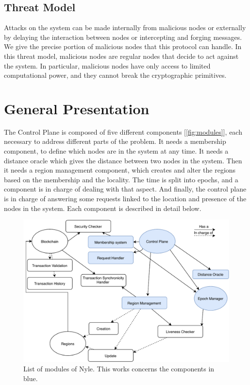 \documentclass[a4paper,11pt,twoside,openright]{report}
\begin{document}
\subsection{Threat Model}
Attacks on the system can be made internally from malicious nodes or
externally by delaying the interaction between nodes or intercepting and
forging messages. We give the precise portion of malicious nodes that
this protocol can handle. In this threat model, malicious nodes are regular
nodes that decide to act against the system. In particular, malicious nodes
have only access to limited computational power, and they cannot break the
cryptographic primitives. 


\section{General Presentation}

The Control Plane is composed of five different components [\autoref{fig:modules}], each necessary to address different parts of the problem.
It needs a membership component, to define which nodes are in the
system at any time. It needs a distance oracle which gives the distance between
two nodes in the system. Then it needs a region management component, which
creates and alter the regions based on the membership and the locality.
The time is split into epochs, and a component is in charge of dealing with that
aspect. And finally, the control plane is in charge of answering some requests
linked to the location and presence of the nodes in the system. Each component
is described in detail below. 

\begin{figure}[!h]
\centering
\includegraphics[width=400pt]{figures/Nyle_components}
\caption{List of modules of Nyle. This works concerns the components in blue.}
\label{fig:modules}
\end{figure}
\end{document}

